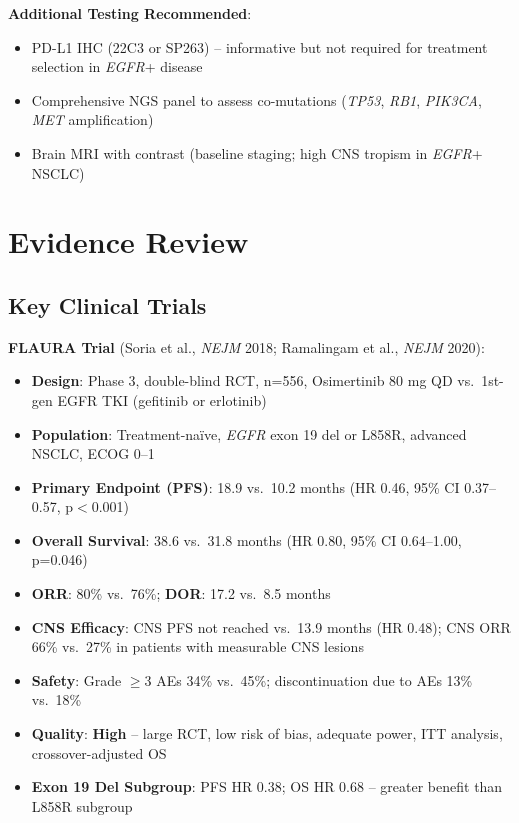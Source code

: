 \documentclass[10pt,letterpaper]{article}
\begin{document}
\textbf{Additional Testing Recommended}:
\begin{itemize}
\item PD-L1 IHC (22C3 or SP263) -- informative but not required for treatment selection in \textit{EGFR}+ disease
\item Comprehensive NGS panel to assess co-mutations (\textit{TP53}, \textit{RB1}, \textit{PIK3CA}, \textit{MET} amplification)
\item Brain MRI with contrast (baseline staging; high CNS tropism in \textit{EGFR}+ NSCLC)
\end{itemize}

\section{Evidence Review}

\subsection{Key Clinical Trials}

\textbf{FLAURA Trial} (Soria et al., \textit{NEJM} 2018; Ramalingam et al., \textit{NEJM} 2020):
\begin{itemize}
\item \textbf{Design}: Phase 3, double-blind RCT, n=556, Osimertinib 80 mg QD vs.~1st-gen EGFR TKI (gefitinib or erlotinib)
\item \textbf{Population}: Treatment-na\"ive, \textit{EGFR} exon 19 del or L858R, advanced NSCLC, ECOG 0--1
\item \textbf{Primary Endpoint (PFS)}: 18.9 vs.~10.2 months (HR 0.46, 95\% CI 0.37--0.57, p$<$0.001)
\item \textbf{Overall Survival}: 38.6 vs.~31.8 months (HR 0.80, 95\% CI 0.64--1.00, p=0.046)
\item \textbf{ORR}: 80\% vs.~76\%; \textbf{DOR}: 17.2 vs.~8.5 months
\item \textbf{CNS Efficacy}: CNS PFS not reached vs.~13.9 months (HR 0.48); CNS ORR 66\% vs.~27\% in patients with measurable CNS lesions
\item \textbf{Safety}: Grade $\geq$3 AEs 34\% vs.~45\%; discontinuation due to AEs 13\% vs.~18\%
\item \textbf{Quality}: \textbf{High} -- large RCT, low risk of bias, adequate power, ITT analysis, crossover-adjusted OS
\item \textbf{Exon 19 Del Subgroup}: PFS HR 0.38; OS HR 0.68 -- greater benefit than L858R subgroup
\end{itemize}
\end{document}
